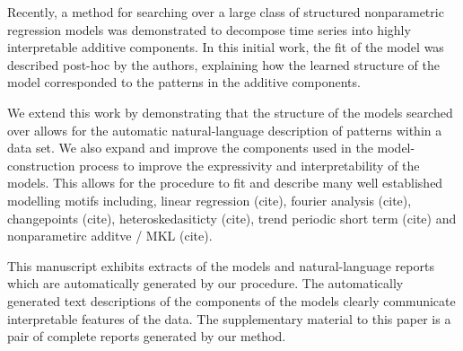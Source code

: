 \documentclass{article}
\begin{document}
Recently, a method for searching over a large class of structured nonparametric regression models \citep{DuvLloGroetal13} was demonstrated to decompose time series into highly interpretable additive components.
In this initial work, the fit of the model was described post-hoc by the authors, explaining how the learned structure of the model corresponded to the patterns in the additive components.


We extend this work by demonstrating that the structure of the models searched over allows for the automatic natural-language description of patterns within a data set.
We also expand and improve the components used in the model-construction process to improve the expressivity and interpretability of the models.
This allows for the procedure to fit and describe many well established modelling motifs including, linear regression (cite), fourier analysis (cite), changepoints (cite), heteroskedasiticty (cite), trend periodic short term (cite) and nonparametirc additve / MKL (cite).

This manuscript exhibits extracts of the models and natural-language reports which are automatically generated by our procedure.
The automatically generated text descriptions of the components of the models clearly communicate interpretable features of the data.
The supplementary material to this paper is a pair of complete reports generated by our method.
\end{document}

